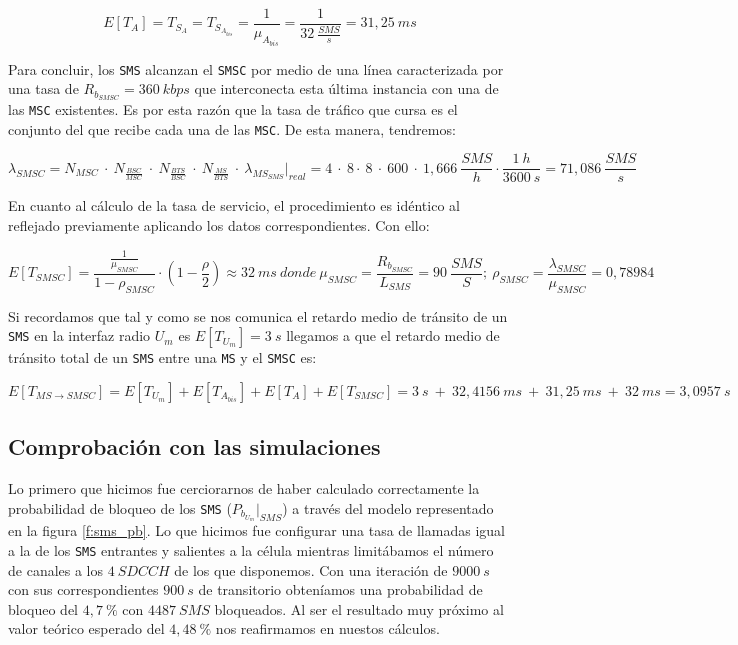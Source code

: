 \documentclass[10pt]{article}
\begin{document}
			$$E[T_A] = T_{S_A} = T_{S_{A_{bis}}} = \frac{1}{\mu_{A_{bis}}} = \frac{1}{32\ \frac{SMS}{s}} = 31,25\ ms$$

			Para concluir, los \texttt{SMS} alcanzan el \texttt{SMSC} por medio de una línea caracterizada por una tasa de $R_{b_{SMSC}} = 360\ kbps$ que interconecta esta última instancia con una de las \texttt{MSC} existentes. Es por esta razón que la tasa de tráfico que cursa es el conjunto del que recibe cada una de las \texttt{MSC}. De esta manera, tendremos:

			$$\lambda_{SMSC} = N_{MSC}\ \cdot\ N_{\frac{BSC}{MSC}}\ \cdot\ N_{\frac{BTS}{BSC}}\ \cdot\ N_{\frac{MS}{BTS}}\ \cdot\ \lambda_{MS_{SMS}}\biggr\rvert_{real} = 4\ \cdot\ 8\cdot\ 8\ \cdot\ 600\ \cdot\ 1,666\ \frac{SMS}{h} \cdot \frac{1\ h}{3600\ s} = 71,086\ \frac{SMS}{s}$$

			En cuanto al cálculo de la tasa de servicio, el procedimiento es idéntico al reflejado previamente aplicando los datos correspondientes. Con ello:

			$$E[T_{SMSC}] = \frac{\frac{1}{\mu_{SMSC}}}{1 - \rho_{SMSC}} \cdot (1 - \frac{\rho}{2}) \approx 32\ ms\ donde\ \mu_{SMSC} = \frac{R_{b_{SMSC}}}{L_{SMS}} = 90\ \frac{SMS}{S};\ \rho_{SMSC} = \frac{\lambda_{SMSC}}{\mu_{SMSC}} = 0,78984$$

			Si recordamos que tal y como se nos comunica el retardo medio de tránsito de un \texttt{SMS} en la interfaz radio $U_m$ es $E[T_{U_m}] = 3\ s$ llegamos a que el retardo medio de tránsito total de un \texttt{SMS} entre una \texttt{MS} y el \texttt{SMSC} es:

			$$E[T_{MS \rightarrow SMSC}] = E[T_{U_m}] + E[T_{A_{bis}}] + E[T_A] + E[T_{SMSC}] = 3\ s\ +\ 32,4156\ ms\ +\ 31,25\ ms\ +\ 32\ ms = 3,0957\ s$$

		\subsection{Comprobación con las simulaciones}
			Lo primero que hicimos fue cerciorarnos de haber calculado correctamente la probabilidad de bloqueo de los \texttt{SMS} ($P_{b_{U_m}}\bigr\rvert_{SMS}$) a través del modelo representado en la figura \ref{f:sms_pb}. Lo que hicimos fue configurar una tasa de llamadas igual a la de los \texttt{SMS} entrantes y salientes a la célula mientras limitábamos el número de canales a los $4\ SDCCH$ de los que disponemos. Con una iteración de $9000\ s$ con sus correspondientes $900\ s$ de transitorio obteníamos una probabilidad de bloqueo del $4,7\ \%$ con $4487\ SMS$ bloqueados. Al ser el resultado muy próximo al valor teórico esperado del $4,48\ \%$ nos reafirmamos en nuestos cálculos.
\end{document}

